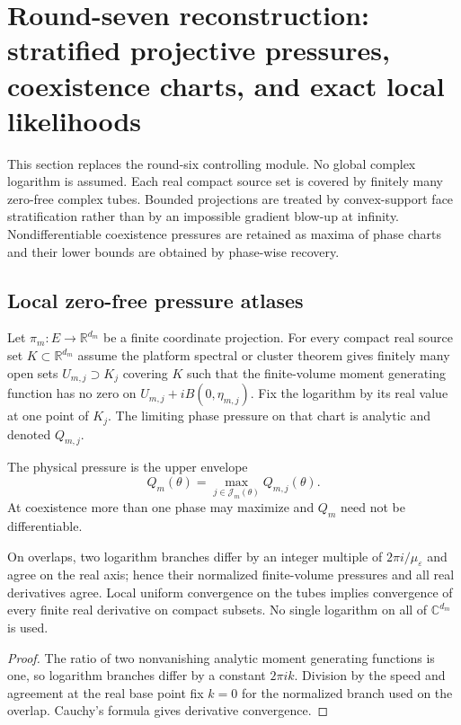 \section{Round-seven reconstruction: stratified projective pressures, coexistence charts, and exact local likelihoods}
\label{sec:r7-d1}

This section replaces the round-six controlling module.  No global complex
logarithm is assumed.  Each real compact source set is covered by finitely many
zero-free complex tubes.  Bounded projections are treated by convex-support
face stratification rather than by an impossible gradient blow-up at infinity.
Nondifferentiable coexistence pressures are retained as maxima of phase charts
and their lower bounds are obtained by phase-wise recovery.

\subsection{Local zero-free pressure atlases}

Let $\pi_m:E\to\mathbb R^{d_m}$ be a finite coordinate projection.  For every
compact real source set $K\subset\mathbb R^{d_m}$ assume the platform spectral
or cluster theorem gives finitely many open sets $U_{m,j}\supset K_j$ covering
$K$ such that the finite-volume moment generating function has no zero on
$U_{m,j}+iB(0,\eta_{m,j})$.  Fix the logarithm by its real value at one point of
$K_j$.  The limiting phase pressure on that chart is analytic and denoted
$Q_{m,j}$.

The physical pressure is the upper envelope
\[
 Q_m(\theta)=\max_{j\in\mathcal J_m(\theta)}Q_{m,j}(\theta).
\]
At coexistence more than one phase may maximize and $Q_m$ need not be
differentiable.

\begin{lemma}
\label{lem:r7-d1-atlas}
On overlaps, two logarithm branches differ by an integer multiple of
$2\pi i/\mu_\varepsilon$ and agree on the real axis; hence their normalized
finite-volume pressures and all real derivatives agree.  Local uniform
convergence on the tubes implies convergence of every finite real derivative
on compact subsets.  No single logarithm on all of $\mathbb C^{d_m}$ is used.
\end{lemma}

\begin{proof}
The ratio of two nonvanishing analytic moment generating functions is one,
so logarithm branches differ by a constant $2\pi i k$.  Division by the speed
and agreement at the real base point fix $k=0$ for the normalized branch used
on the overlap.  Cauchy's formula gives derivative convergence.
\end{proof}

